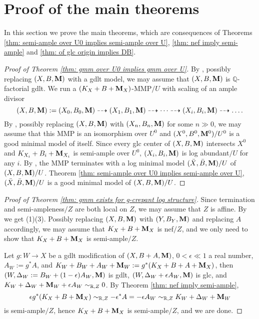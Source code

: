 \documentclass[11pt]{amsart}
\numberwithin{equation}{section}
\newcommand{\Mm}{{\bf{M}}}
\theoremstyle{definition}
\theoremstyle{definition}
\theoremstyle{definition}
\begin{document}
    \section{Proof of the main theorems}\label{sec: proof of the main theorems}

    In this section we prove the main theorems, which are
    consequences of Theorems  \ref{thm: semi-ample over U0 implies
    semi-ample over U}, \ref{thm: nef imply semi-ample} and \ref{thm:
    of glc origin implies DB}.

    \begin{proof}[Proof of Theorem \ref{thm: gmm over U0 implies gmm over U}]
      By \cite[Theorem 3.14]{HL21a}, possibly replacing $(X,B,\Mm)$
      with a gdlt model, we may assume that $(X,B,\Mm)$ is $\mathbb
      Q$-factorial gdlt. We run a $(K_X+B+\Mm_X)$-MMP$/U$ with
      scaling of an ample divisor
      $$(X,B,\Mm):=(X_0,B_0,\Mm)\dashrightarrow
      (X_1,B_1,\Mm)\dashrightarrow\dots\dashrightarrow
      (X_i,B_i,\Mm)\dashrightarrow\dots.$$
      By \cite[Lemma 2.7]{LX22}, possibly replacing $(X,B,\Mm)$ with
      $(X_n,B_n,\Mm)$ for some $n\gg 0$, we may assume that this MMP
      is an isomorphism over $U^0$ and $(X^0,B^0,\Mm^0)/U^0$ is a
      good minimal model of itself. Since every glc center of
      $(X,B,\Mm)$ intersects $X^0$ and $K_{X_i}+B_i+\Mm_{X_i}$ is
      semi-ample over $U^0$, $(X_i,B_i,\Mm)$ is log abundant$/U$ for
      any $i$. By \cite[Theorem 7.6]{LX22}, the MMP terminates with a
      log minimal model $(\bar X,\bar B,\Mm)/U$ of $(X,B,\Mm)/U$.
      Theorem \ref{thm: semi-ample over U0 implies semi-ample over
      U}, $(\bar X,\bar B,\Mm)/U$ is a good minimal model of $(X,B,\Mm)/U$.
    \end{proof}

    \begin{proof}[Proof of Theorem \ref{thm: gmm exists for g-crepant
      log structure}]
      Since termination and semi-ampleness$/Z$ are both local on $Z$,
      we may assume that $Z$ is affine. By \cite[Theorem 1.3]{LX22}
      we get (1)(3). Possibly replacing $(X,B,\Mm)$ with
      $(Y,B_Y,\Mm)$ and replacing $A$ accordingly, we may assume that
      $K_X+B+\Mm_X$ is nef$/Z$, and we only need to show that
      $K_X+B+\Mm_X$ is semi-ample$/Z$.

      Let $g: W\rightarrow X$ be a gdlt modification of
      $(X,B+A,\Mm)$, $0<\epsilon\ll 1$ a real number, $A_W:=g^*A$,
      and $K_W+B_W+A_W+\Mm_W:=g^*(K_X+B+A+\Mm_X)$, then
      $(W,\Delta_W:=B_W+(1-\epsilon)A_W,\Mm)$ is gdlt,
      $(W,\Delta_W+\epsilon A_W,\Mm)$ is glc, and
      $K_W+\Delta_W+\Mm_W+\epsilon A_W\sim_{\mathbb R,Z}0$. By
      Theorem \ref{thm: nef imply semi-ample},
      $$\epsilon g^*(K_X+B+\Mm_X)\sim_{\mathbb
      R,Z}-\epsilon^*A=-\epsilon A_W\sim_{\mathbb R,Z}K_W+\Delta_W+\Mm_W$$
      is semi-ample$/Z$, hence $K_X+B+\Mm_X$ is semi-ample$/Z$, and we are done.
    \end{proof}
\end{document}
